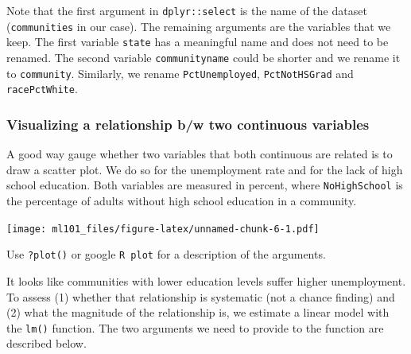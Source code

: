 \documentclass[]{article}
\newenvironment{Shaded}{\begin{snugshade}}{\end{snugshade}}
\newcommand{\DataTypeTok}[1]{\textcolor[rgb]{0.13,0.29,0.53}{#1}}
\newcommand{\DecValTok}[1]{\textcolor[rgb]{0.00,0.00,0.81}{#1}}
\newcommand{\KeywordTok}[1]{\textcolor[rgb]{0.13,0.29,0.53}{\textbf{#1}}}
\newcommand{\NormalTok}[1]{#1}
\newcommand{\OperatorTok}[1]{\textcolor[rgb]{0.81,0.36,0.00}{\textbf{#1}}}
\newcommand{\StringTok}[1]{\textcolor[rgb]{0.31,0.60,0.02}{#1}}
\begin{document}
Note that the first argument in \texttt{dplyr::select} is the name of the dataset (\texttt{communities} in our case). The remaining arguments are the variables that we keep. The first variable \texttt{state} has a meaningful name and does not need to be renamed. The second variable \texttt{communityname} could be shorter and we rename it to \texttt{community}. Similarly, we rename \texttt{PctUnemployed}, \texttt{PctNotHSGrad} and \texttt{racePctWhite}.

\hypertarget{visualizing-a-relationship-bw-two-continuous-variables}{%
\subsubsection{Visualizing a relationship b/w two continuous variables}\label{visualizing-a-relationship-bw-two-continuous-variables}}

A good way gauge whether two variables that both continuous are related is to draw a scatter plot. We do so for the unemployment rate and for the lack of high school education. Both variables are measured in percent, where \texttt{NoHighSchool} is the percentage of adults without high school education in a community.

\begin{Shaded}
\end{Shaded}

\texttt{[image: ml101\_files/figure-latex/unnamed-chunk-6-1.pdf]}

Use \texttt{?plot()} or google \texttt{R\ plot} for a description of the arguments.

It looks like communities with lower education levels suffer higher unemployment. To assess (1) whether that relationship is systematic (not a chance finding) and (2) what the magnitude of the relationship is, we estimate a linear model with the \texttt{lm()} function. The two arguments we need to provide to the function are described below.
\end{document}
